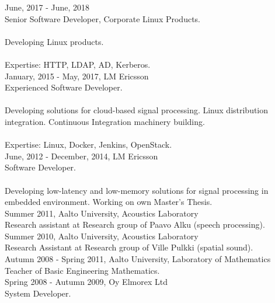\documentclass[12pt]{article}
\begin{document}
\large{June, 2017 - June, 2018}\\
\normalsize{Senior Software Developer, Corporate Linux Products.}\\
\\
\normalsize{Developing Linux products.}\\
\\
\normalsize{Expertise: HTTP, LDAP, AD, Kerberos.}\\

\large{January, 2015 - May, 2017, LM Ericsson}\\
\normalsize{Experienced Software Developer.}\\
\\
\normalsize{Developing solutions for cloud-based signal processing. Linux distribution integration. Continuous Integration machinery building.}\\
\\
\normalsize{Expertise: Linux, Docker, Jenkins, OpenStack.}\\

\large{June, 2012 - December, 2014, LM Ericsson}\\
\normalsize{Software Developer.}\\
\\
\normalsize{Developing low-latency and low-memory solutions for signal processing in embedded environment. Working on own Master's Thesis.}\\

\large{Summer 2011, Aalto University, Acoustics Laboratory}\\
\normalsize{Research assistant at Research group of Paavo Alku (speech
processing).}\\

\large{Summer 2010, Aalto University, Acoustics Laboratory}\\
\normalsize{Research Assistant at Research group of Ville Pulkki (spatial
sound).}\\

\large{Autumn 2008 - Spring 2011, Aalto University, Laboratory of Mathematics}\\
\normalsize{Teacher of Basic Engineering Mathematics.}\\

\large{Spring 2008 - Autumn 2009, Oy Elmorex Ltd}\\
\normalsize{System Developer.}\\

\end{document}
